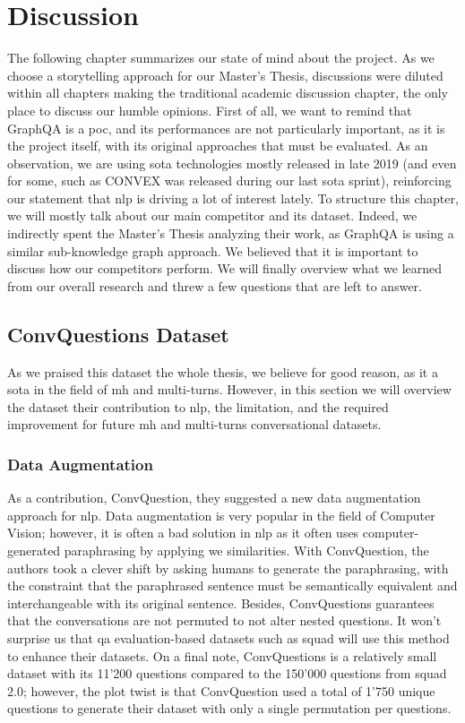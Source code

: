 \chapter{Discussion}
\label{chap:discussion}

The following chapter summarizes our state of mind about the project. As we choose a storytelling approach for our Master's Thesis, discussions were diluted within all chapters making the traditional academic discussion chapter, the only place to discuss our humble opinions. First of all, we want to remind that GraphQA is a \gls{poc}, and its performances are not particularly important, as it is the project itself, with its original approaches that must be evaluated. As an observation, we are using \gls{sota} technologies mostly released in late 2019 (and even for some, such as CONVEX was released during our last \gls{sota} sprint), reinforcing our statement that \gls{nlp} is driving a lot of interest lately. To structure this chapter, we will mostly talk about our main competitor and its dataset. Indeed, we indirectly spent the Master's Thesis analyzing their work, as GraphQA is using a similar sub-knowledge graph approach. We believed that it is important to discuss how our competitors perform. We will finally overview what we learned from our overall research and threw a few questions that are left to answer.


\section{ConvQuestions Dataset}
As we praised this dataset the whole thesis, we believe for good reason, as it a \gls{sota} in the field of  \gls{mh} and multi-turns. However, in this section we will overview the dataset their contribution to \gls{nlp}, the limitation, and the required improvement for future \gls{mh} and multi-turns conversational datasets.

\subsection{Data Augmentation}
As a contribution, ConvQuestion, they suggested a new data augmentation approach for \gls{nlp}. Data augmentation is very popular in the field of Computer Vision; however, it is often a bad solution in \gls{nlp} as it often uses computer-generated paraphrasing by applying \gls{we} similarities. With ConvQuestion, the authors took a clever shift by asking humans to generate the paraphrasing, with the constraint that the paraphrased sentence must be semantically equivalent and interchangeable with its original sentence. Besides, ConvQuestions guarantees that the conversations are not permuted to not alter nested questions. It won't surprise us that \gls{qa} evaluation-based datasets such as \gls{squad} will use this method to enhance their datasets. On a final note, ConvQuestions is a relatively small dataset with its 11'200 questions compared to the 150'000 questions from \gls{squad} 2.0; however, the plot twist is that ConvQuestion used a total of 1'750 unique questions to generate their dataset with only a single permutation per questions.

